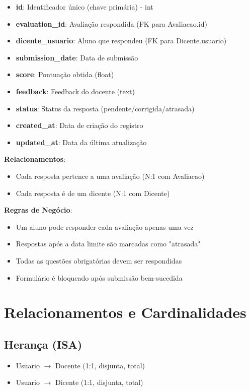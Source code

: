 \documentclass[a4paper,12pt]{article}
\begin{document}
\begin{itemize}
    \item \textbf{id}: Identificador único (chave primária) - int
    \item \textbf{evaluation\_id}: Avaliação respondida (FK para Avaliacao.id)
    \item \textbf{dicente\_usuario}: Aluno que respondeu (FK para Dicente.usuario)
    \item \textbf{submission\_date}: Data de submissão
    \item \textbf{score}: Pontuação obtida (float)
    \item \textbf{feedback}: Feedback do docente (text)
    \item \textbf{status}: Status da resposta (pendente/corrigida/atrasada)
    \item \textbf{created\_at}: Data de criação do registro
    \item \textbf{updated\_at}: Data da última atualização
\end{itemize}

\textbf{Relacionamentos}:
\begin{itemize}
    \item Cada resposta pertence a uma avaliação (N:1 com Avaliacao)
    \item Cada resposta é de um dicente (N:1 com Dicente)
\end{itemize}

\textbf{Regras de Negócio}:
\begin{itemize}
    \item Um aluno pode responder cada avaliação apenas uma vez
    \item Respostas após a data limite são marcadas como "atrasada"
    \item Todas as questões obrigatórias devem ser respondidas
    \item Formulário é bloqueado após submissão bem-sucedida
\end{itemize}

\section{Relacionamentos e Cardinalidades}

\subsection{Herança (ISA)}
\begin{itemize}
    \item Usuario $\rightarrow$ Docente (1:1, disjunta, total)
    \item Usuario $\rightarrow$ Dicente (1:1, disjunta, total)
\end{itemize}
\end{document}
